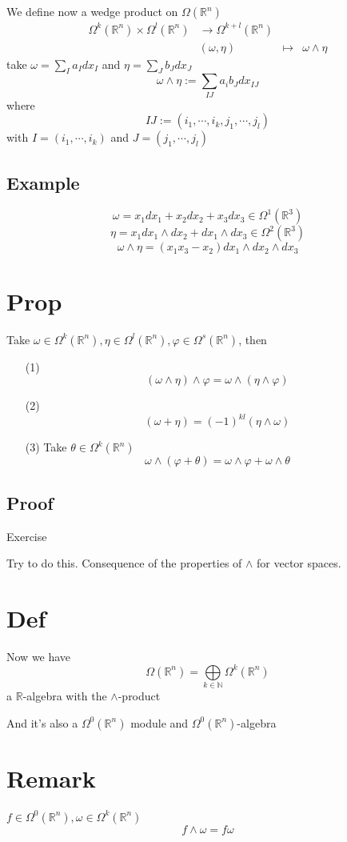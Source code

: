 \documentclass{book}
\begin{document}
We define now a wedge product on $\Omega(\mathbb{R}^n)$
$$\begin{aligned}
    \Omega^k(\mathbb{R}^n)\times\Omega^l(\mathbb{R}^n)&\rightarrow\Omega^{k+l}(\mathbb{R}^n)\\
    &(\omega,\eta)&\mapsto &\omega\wedge\eta
\end{aligned}$$
take $\omega=\sum\limits_{I}a_Idx_I$ and $\eta=\sum\limits_{J}b_Jdx_J$
$$\omega\wedge\eta:=\sum\limits_{IJ}a_ib_Jdx_{IJ}$$
where $$IJ:=(i_1,\cdots,i_k,j_1,\cdots,j_l)$$with $I=(i_1,\cdots,i_k)$ and $J=(j_1,\cdots,j_l)$
\subsection*{Example}
$$\omega=x_1dx_1+x_2dx_2+x_3dx_3\in \Omega^1(\mathbb{R}^3)$$
$$\eta=x_1dx_1\wedge dx_2+dx_1\wedge dx_3\in \Omega^2(\mathbb{R}^3)$$
$$\omega\wedge\eta=(x_1x_3-x_2)dx_1\wedge dx_2\wedge dx_3$$
\section{Prop}
Take $\omega\in \Omega^k(\mathbb{R}^n),\eta\in \Omega^l(\mathbb{R}^n),\varphi\in \Omega^s(\mathbb{R}^n)$, then
\begin{itemize}
    \item [(1)]$$(\omega\wedge\eta)\wedge\varphi=\omega\wedge(\eta\wedge\varphi)$$
    \item [(2)]$$(\omega+\eta)=(-1)^{kl}(\eta\wedge\omega)$$
    \item [(3)]Take $\theta\in \Omega^k(\mathbb{R}^n)$$$\omega\wedge(\varphi+\theta)=\omega\wedge\varphi+\omega\wedge\theta$$
\end{itemize}
\subsection*{Proof}
Exercise

Try to do this. Consequence of the properties of $\wedge$ for vector spaces.
\section{Def}
Now we have $$\Omega(\mathbb{R}^n)=\bigoplus\limits_{k\in \mathbb{N}}\Omega^k(\mathbb{R}^n)$$ a $\mathbb{R}$-algebra with the $\wedge$-product

And it's also a $\Omega^0(\mathbb{R}^n)$ module and $\Omega^0(\mathbb{R}^n)$-algebra
\section{Remark}
$f\in \Omega^0(\mathbb{R}^n),\omega\in \Omega^k(\mathbb{R}^n)$$$f\wedge\omega=f\omega$$
\end{document}
